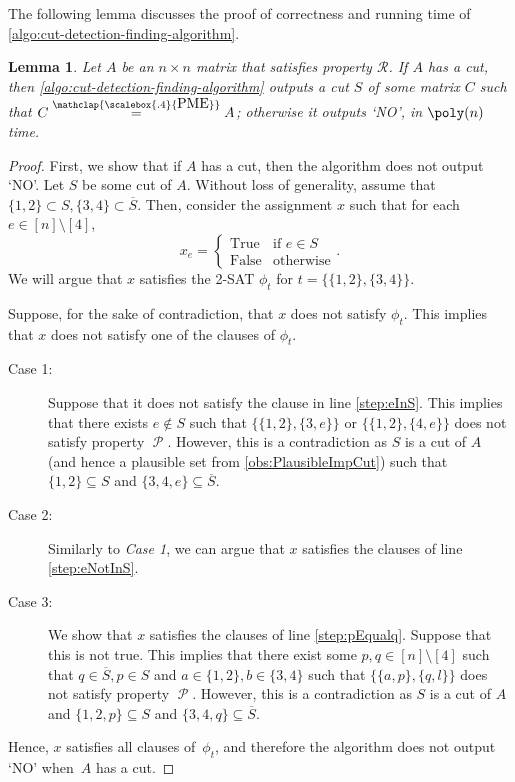 \documentclass[11pt,letterpaper]{article}
\newcommand{\comp}[1]{\overline{#1}}
\newtheorem{lemma}{Lemma}[section]
\DeclareMathOperator{\calP}{\mathcal{P}}
\newcommand{\pp}[2]{\{\{#1\},\{#2\}\}}
\newcommand{\PME}{\stackrel{\mathclap{\scalebox{.4}{\mbox{PME}}}}{=}}
\newcommand{\prop}{\mathcal{R}}
\begin{document}
{{{ The following lemma discusses the proof of correctness and running time of \cref{algo:cut-detection-finding-algorithm}.
\begin{lemma}\label{lem:CorrectnessOfCutFinding}
Let $A$ be an $n\times n$ matrix that satisfies property $\prop$. If $A$ has a cut, then \cref{algo:cut-detection-finding-algorithm} outputs a cut $S$ of some matrix $C$ such that $C\PME A$; otherwise it outputs `NO', in $\poly(n)$ time.
\end{lemma}
\begin{proof}
First, we show that if $A$ has a cut, then the algorithm does not output `NO'. Let $S$ be some cut of $A$. Without loss of generality, assume that $\{1,2\}\subset S,\{3,4\}\subset \comp{S}$. Then, consider the assignment  $x$ such that for each $e\in [n]\setminus [4]$, \[x_e=\begin{cases}\text{True} & \text{if } e\in S\\
\text{False} & \text{otherwise}\end{cases}.\] We will argue that  $x$ satisfies the 2-SAT $\phi_t$ for $t=\pp{1,2}{3,4}$. 

Suppose, for the sake of contradiction, that $x$ does not satisfy $\phi_t$. This implies that $x$ does not satisfy one of the clauses of $\phi_t$. 
\begin{description}
\item [Case 1:] Suppose that it does not satisfy the clause in line \ref{step:eInS}. This implies that there exists $e\notin S$ such that $\pp{1,2}{3,e}$ or $\pp{1,2}{4,e}$ does not satisfy  property $\calP$. However, this is a contradiction as $S$ is a cut of $A$ (and hence a plausible set from \cref{obs:PlausibleImpCut}) such that $\{1,2\}\subseteq S$ and $\{3,4,e\}\subseteq \overline{S}$. 

\item [Case 2:] Similarly to \emph{Case 1}, we can argue that $x$ satisfies the clauses of line \ref{step:eNotInS}. 

\item [Case 3:] We show that $x$ satisfies the clauses of line \ref{step:pEqualq}. Suppose that this is not true. This implies that there exist some $p,q\in [n]\setminus [4]$ such that $q\in \comp{S},p\in {S}$ and $a\in \{1,2\},b\in \{3,4\}$ such that $\pp{a,p}{q,l}$ does not satisfy property $\calP$. However, this is a contradiction as $S$ is a cut of $A$ and $\{1,2,p\}\subseteq S$ and $\{3,4,q\}\subseteq \comp{S}$. 
\end{description}
Hence, $x$ satisfies all clauses of~$\phi_t$, and therefore the algorithm does not output `NO' when~$A$ has a cut.



\end{proof}}}}
\end{document}
